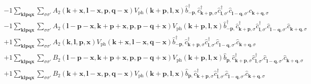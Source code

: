 \begin{align*}
	&-1 \sum_{ \mathbf{k} \mathbf{l} \mathbf{p} \mathbf{q} \mathbf{x} } \sum_{ \sigma \sigma' } A_2( \mathbf{k}+\mathbf{x}, \mathbf{l}-\mathbf{x}, \mathbf{p}, \mathbf{q}-\mathbf{x} )  V_\mathrm{ph}( \mathbf{k}+\mathbf{p}, \mathbf{l}, \mathbf{x} )   \hat{b}_{ -\mathbf{p}, }^\dagger  \hat{c}_{ \mathbf{k}+\mathbf{p}, \sigma }^\dagger  \hat{c}_{ \mathbf{l}, \sigma' }^\dagger  \hat{c}_{ \mathbf{l}-\mathbf{q}, \sigma' }^{\phantom{\dagger}} \hat{c}_{ \mathbf{k}+\mathbf{q}, \sigma }^{\phantom{\dagger}}  \\
	&-1 \sum_{ \mathbf{k} \mathbf{l} \mathbf{p} \mathbf{q} \mathbf{x} } \sum_{ \sigma \sigma' } A_2( \mathbf{l}-\mathbf{p}-\mathbf{x}, \mathbf{k}+\mathbf{p}+\mathbf{x}, \mathbf{p}, \mathbf{p}-\mathbf{q}+\mathbf{x} )  V_\mathrm{ph}( \mathbf{k}+\mathbf{p}, \mathbf{l}, \mathbf{x} )   \hat{b}_{ -\mathbf{p}, }^\dagger  \hat{c}_{ \mathbf{k}+\mathbf{p}, \sigma }^\dagger  \hat{c}_{ \mathbf{l}, \sigma' }^\dagger  \hat{c}_{ \mathbf{l}-\mathbf{q}, \sigma' }^{\phantom{\dagger}} \hat{c}_{ \mathbf{k}+\mathbf{q}, \sigma }^{\phantom{\dagger}}  \\
	&+1 \sum_{ \mathbf{k} \mathbf{l} \mathbf{p} \mathbf{q} \mathbf{x} } \sum_{ \sigma \sigma' } A_2( \mathbf{k}, \mathbf{l}, \mathbf{p}, \mathbf{x} )  V_\mathrm{ph}( \mathbf{k}+\mathbf{x}, \mathbf{l}-\mathbf{x}, \mathbf{q}-\mathbf{x} )   \hat{b}_{ -\mathbf{p}, }^\dagger  \hat{c}_{ \mathbf{k}+\mathbf{p}, \sigma }^\dagger  \hat{c}_{ \mathbf{l}, \sigma' }^\dagger  \hat{c}_{ \mathbf{l}-\mathbf{q}, \sigma' }^{\phantom{\dagger}} \hat{c}_{ \mathbf{k}+\mathbf{q}, \sigma }^{\phantom{\dagger}}  \\
	&+1 \sum_{ \mathbf{k} \mathbf{l} \mathbf{p} \mathbf{q} \mathbf{x} } \sum_{ \sigma \sigma' } B_2( \mathbf{l}-\mathbf{p}-\mathbf{x}, \mathbf{k}+\mathbf{p}+\mathbf{x}, \mathbf{p}, \mathbf{p}-\mathbf{q}+\mathbf{x} )  V_\mathrm{ph}( \mathbf{k}+\mathbf{p}, \mathbf{l}, \mathbf{x} )   \hat{b}_{ \mathbf{p}, }^{\phantom{\dagger}} \hat{c}_{ \mathbf{k}+\mathbf{p}, \sigma }^\dagger  \hat{c}_{ \mathbf{l}, \sigma' }^\dagger  \hat{c}_{ \mathbf{l}-\mathbf{q}, \sigma' }^{\phantom{\dagger}} \hat{c}_{ \mathbf{k}+\mathbf{q}, \sigma }^{\phantom{\dagger}}  \\
	&+1 \sum_{ \mathbf{k} \mathbf{l} \mathbf{p} \mathbf{q} \mathbf{x} } \sum_{ \sigma \sigma' } B_2( \mathbf{k}+\mathbf{x}, \mathbf{l}-\mathbf{x}, \mathbf{p}, \mathbf{q}-\mathbf{x} )  V_\mathrm{ph}( \mathbf{k}+\mathbf{p}, \mathbf{l}, \mathbf{x} )   \hat{b}_{ \mathbf{p}, }^{\phantom{\dagger}} \hat{c}_{ \mathbf{k}+\mathbf{p}, \sigma }^\dagger  \hat{c}_{ \mathbf{l}, \sigma' }^\dagger  \hat{c}_{ \mathbf{l}-\mathbf{q}, \sigma' }^{\phantom{\dagger}} \hat{c}_{ \mathbf{k}+\mathbf{q}, \sigma }^{\phantom{\dagger}}  \\

\end{align*}
